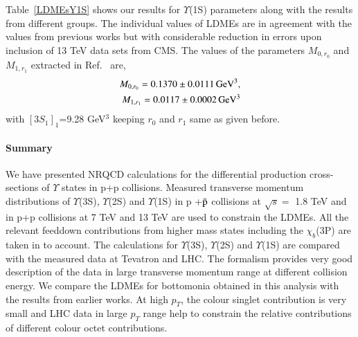 \documentclass[review]{elsarticle}
\begin{document}
Table~\ref{LDMEsY1S} shows our results for $\Upsilon$(1S) parameters along with
the results from different groups. The individual values of LDMEs are in agreement with
the values from previous works but with considerable reduction in 
errors upon inclusion of 13 TeV data sets from CMS.
The values of the parameters $M_{0,r_0}$ and $M_{1,r_1}$ extracted in Ref.~\cite{Han:2014kxa} are,
\begin{eqnarray}
  \nonumber
  M_{0,r_0}=0.1370\pm0.0111 \, {\rm GeV^3},\\ \nonumber
  M_{1,r_1}=0.0117\pm0.0002 \, {\rm GeV^3}
\end{eqnarray}
with $[3S_1]_1$=9.28 GeV$^3$ keeping $r_0$ and $r_1$ same as given before.

\paragraph{Summary}
\label{sec:summary}
We have presented NRQCD calculations for the differential production 
cross-sections of $\Upsilon$ states in  p+p collisions.  Measured transverse momentum
distributions of $\Upsilon$(3S), 
$\Upsilon$(2S) and $\Upsilon$(1S) in p +{$\bar {\rm p}$} collisions at $\sqrt{s}=$ 1.8 TeV and in 
p+p collisions at 7 TeV and 13 TeV are used to constrain the LDMEs. All the relevant feeddown
contributions from higher mass states including the $\chi_{b}$(3P) are taken in to account.
The calculations for  $\Upsilon$(3S), $\Upsilon$(2S) and $\Upsilon$(1S) are compared with 
the measured data at Tevatron and LHC. The formalism provides  very good description of the data in 
large transverse momentum range at different collision energy. 
We compare the LDMEs for bottomonia obtained in this analysis with the results from earlier works.
At high $p_T$, the colour singlet contribution is very small and LHC data in large $p_T$ range 
help to constrain the relative contributions of different colour octet contributions.
\end{document}
